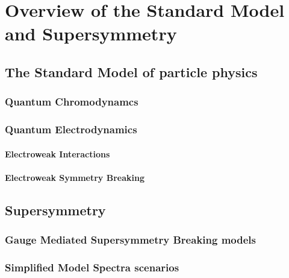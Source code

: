 \chapter{Overview of the Standard Model and Supersymmetry}
\label{chap:StandarModelOverview}


\section{The Standard Model of particle physics}
\label{sec:StandardModel}



\subsection{Quantum Chromodynamcs}


\subsection{Quantum Electrodynamics}


\subsubsection{Electroweak Interactions}


\subsubsection{Electroweak Symmetry Breaking}


\section{Supersymmetry}
\label{sec:Supersymmetry}


\subsection{Gauge Mediated Supersymmetry Breaking models}


\subsection{Simplified Model Spectra scenarios}